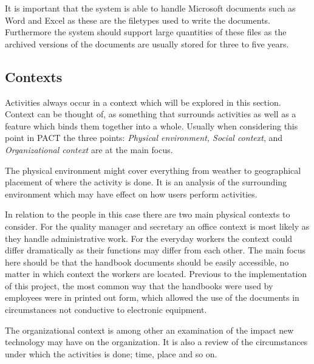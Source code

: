 It is important that the system is able to handle Microsoft documents such as Word and Excel as these are the filetypes used to write the documents.
Furthermore the system should support large quantities of these files as the archived versions of the documents are usually stored for three to five years.

\subsection{Contexts}
Activities always occur in a context which will be explored in this section.
Context can be thought of, as something that surrounds activities as well as a feature which binds them together into a whole.
Usually when considering this point in PACT the three points: \textit{Physical environment, Social context}, and \textit{Organizational context} are at the main focus.
\citep{Benyon}

The physical environment might cover everything from weather to geographical placement of where the activity is done.
It is an analysis of the surrounding environment which may have effect on how users perform activities.
\citep{Benyon}

In relation to the people in this case there are two main physical contexts to consider.
For the quality manager and secretary an office context is most likely as they handle administrative work.
For the everyday workers the context could differ dramatically as their functions may differ from each other.
The main focus here should be that the handbook documents should be easily accessible, no matter in which context the workers are located.
Previous to the implementation of this project, the most common way that the handbooks were used by employees were in printed out form, which allowed the use of the documents in circumstances not conductive to electronic equipment. %



The organizational context is among other an examination of the impact new technology may have on the organization.
It is also a review of the circumstances under which the activities is done; time, place and so on.
\citep{Benyon}

